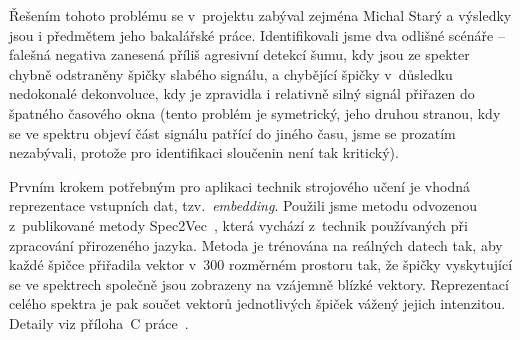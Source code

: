 \documentclass[a4paper,11pt]{article}
\begin{document}
Řešením tohoto problému se v~projektu zabýval zejména Michal Starý a výsledky jsou i předmětem jeho bakalářské práce.
Identifikovali jsme dva odlišné scénáře -- falešná negativa zanesená příliš agresivní detekcí šumu, kdy jsou ze spekter
chybně odstraněny špičky slabého signálu, a chybějící špičky v~důsledku nedokonalé dekonvoluce, kdy je zpravidla
i relativně silný signál přiřazen do špatného časového okna (tento problém je symetrický, jeho druhou stranou, kdy se 
ve spektru objeví část signálu patřící do jiného času, jsme se prozatím nezabývali, protože pro identifikaci sloučenin
není tak kritický).


Prvním krokem potřebným pro aplikaci technik strojového učení je vhodná reprezentace 
vstupních dat, tzv.~\emph{embedding}. Použili jsme metodu odvozenou z~publikované metody Spec2Vec~\cite{spec2vec},
která vychází z~technik používaných při zpracování přirozeného jazyka.
Metoda je trénována na reálných datech tak, aby každé špičce přiřadila vektor v~300 rozměrném prostoru tak,
že špičky vyskytující se ve spektrech společně jsou zobrazeny na vzájemně blízké vektory.
Reprezentací celého spektra je pak součet vektorů jednotlivých špiček vážený jejich intenzitou.
Detaily viz příloha~C práce~\cite{stary}.
\end{document}
